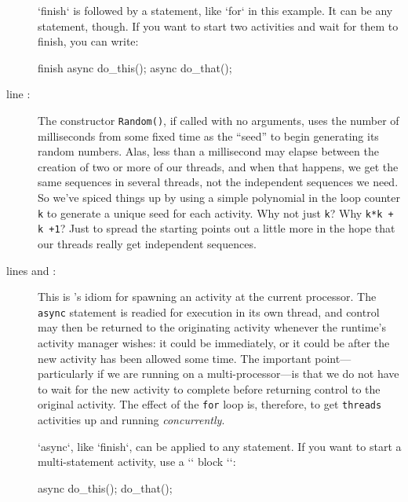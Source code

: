 \begin{description}
\xcd`finish` is followed by a statement, like \xcd`for` in this example.  It
can be any statement, though.  If you want to start two activities and wait
for them to finish, you can write: 

\begin{xtennum}[numbers=none]
finish {
  async do_this();
  async do_that();
}
\end{xtennum}


\item[line \xlref{mpia-r}{8}:]  The constructor {\tt Random()}, if called with no arguments,
uses the number of milliseconds from some fixed time as the ``seed'' to begin
generating its random numbers. Alas, less than a millisecond may elapse between
the creation of two or more of our threads, and when that happens, we get the
same sequences in several threads, not the independent sequences we need.
So we've spiced things up by using a simple
polynomial in the loop counter {\tt k} to generate a unique seed for each activity.
Why not just {\tt k}? Why {\tt k*k + k +1}?  Just to spread the starting points out
a little more in the hope that our threads really
get independent sequences.

\item[lines \xlref{mpia-kval}{10} and \xlref{mpia-async}{11}:]
This is \Xten's idiom for spawning an activity
at the current processor.
The {\tt async} statement is readied for execution in its own thread, and control
may then be returned to the originating activity whenever the \Xten{} runtime's
activity manager wishes: it could be immediately, or it could be after the new
activity has been allowed some time. The important point---particularly if we
are running on a multi-processor---is that we do not have
to wait for the new activity to complete before returning control to the
original activity.  The effect of the {\tt for} loop is, therefore, to get
{\tt threads} activities up and running {\em concurrently}.

\xcd`async`, like \xcd`finish`, can be applied to any statement.  If you want
to start a multi-statement activity, use a \xcd`{` block \xcd`}`: 

\begin{xtennum}[]
async {
  do_this();
  do_that();
}    
\end{xtennum}



\end{description}

